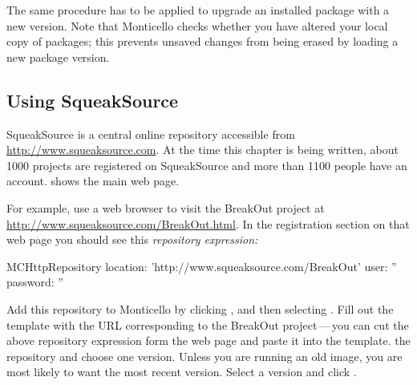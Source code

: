 \documentclass[a4paper,10pt,twoside]{book}
\begin{document}

The same procedure has to be applied to upgrade an installed package with a new version. Note that Monticello checks whether you have altered your local copy of packages; this prevents unsaved changes from being erased by loading a new package version.


\subsection{Using SqueakSource}

SqueakSource is a central online repository accessible from \url{http://www.squeaksource.com}. At the time this chapter is being written, about 1000 projects are registered on SqueakSource and more than 1100 people have an account.  shows the main web page.  

For example, use a web browser to visit the BreakOut project at \url{http://www.squeaksource.com/BreakOut.html}. In the registration section on that web page you should see this \emph{repository expression:}

\begin{code}{}
MCHttpRepository
    location: 'http://www.squeaksource.com/BreakOut'
    user: ''
    password: ''
\end{code}

Add this repository to Monticello by clicking , and then selecting . Fill out the template with the URL corresponding to the BreakOut project\,---\,you can cut the above repository expression form the web page and paste it into the template.
 the repository and choose one version. 
Unless you are running an old image, you are most likely to want the most recent version. Select a version and click .
\end{document}
